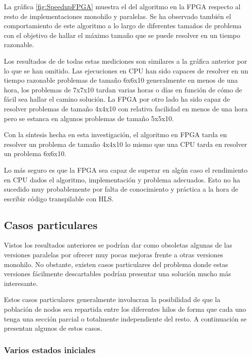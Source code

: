 La gráfica \ref{fig:SpeedupFPGA} muestra el  del algoritmo
en la FPGA respecto al resto de implementaciones monohilo y paralelas.
Se ha observado también el comportamiento de este algoritmo
a lo largo de diferentes tamaños de problema con el objetivo de hallar el
máximo tamaño que se puede resolver en un tiempo razonable.

Los resultados de  de todas estas mediciones son similares
a la gráfica anterior por lo que se han omitido.
Las ejecuciones en CPU han sido capaces de resolver en un tiempo
razonable problemas de tamaño 6x6x10 generalmente en menos de una hora, los problemas
de 7x7x10 tardan varias horas o días en función de cómo de fácil sea hallar
el camino solución.
La FPGA por otro lado ha sido capaz de resolver problemas de tamaño 4x4x10
con relativa facilidad en menos de una hora pero se estanca en algunos
problemas de tamaño 5x5x10.

\begin{keynotebox}
    Con la síntesis hecha en esta investigación,
    el algoritmo en FPGA tarda en resolver un problema
    de tamaño 4x4x10 lo mismo que una CPU tarda
    en resolver un problema 6x6x10.
\end{keynotebox}

Lo más seguro es que la FPGA sea capaz de superar en algún caso el rendimiento
en CPU dados el algoritmo, implementación y problema adecuados.
Esto no ha sucedido muy probablemente por falta de conocimiento y práctica
a la hora de escribir código transpilable con HLS.

\pagebreak
\subsection{Casos particulares}

Vistos los resultados anteriores
se podrían dar como obsoletas algunas de las versiones
paralelas por ofrecer muy pocas mejoras frente a otras
versiones monohilo.
No obstante, existen casos particulares del problema
donde estas versiones fácilmente descartables
podrían presentar una solución mucho más interesante.

Estos casos particulares generalmente involucran
la posibilidad de que la población de nodos sea
repartida entre los diferentes hilos de forma
que cada uno tenga una sección parcial o totalmente
independiente del resto.
A continuación se presentan algunos de estos casos.

\subsubsection{Varios estados iniciales}

